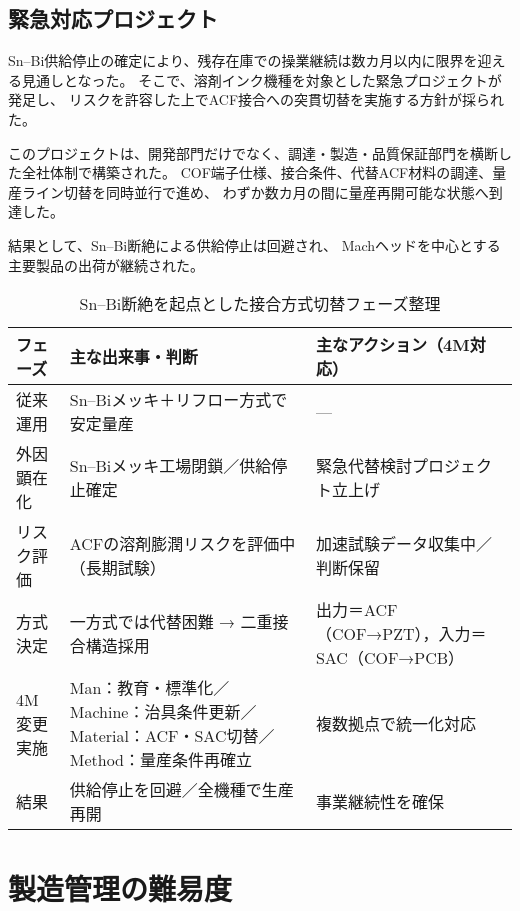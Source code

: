 \documentclass[conference]{IEEEtran}
\begin{document}
\subsection{緊急対応プロジェクト}
Sn–Bi供給停止の確定により、残存在庫での操業継続は数カ月以内に限界を迎える見通しとなった。  
そこで、溶剤インク機種を対象とした緊急プロジェクトが発足し、  
リスクを許容した上でACF接合への突貫切替を実施する方針が採られた。  

このプロジェクトは、開発部門だけでなく、調達・製造・品質保証部門を横断した全社体制で構築された。  
COF端子仕様、接合条件、代替ACF材料の調達、量産ライン切替を同時並行で進め、  
わずか数カ月の間に量産再開可能な状態へ到達した。  

結果として、Sn–Bi断絶による供給停止は回避され、  
Machヘッドを中心とする主要製品の出荷が継続された。

\begin{table}[t]
\centering
\footnotesize
\caption{Sn–Bi断絶を起点とした接合方式切替フェーズ整理}
\label{tab:flow}
\renewcommand{\arraystretch}{1.1}
\begin{tabularx}{\columnwidth}{@{}p{1.9cm} Y Y@{}}
\toprule
フェーズ & 主な出来事・判断 & 主なアクション（4M対応） \\
\midrule
従来運用 &
Sn–Biメッキ＋リフロー方式で安定量産 &
— \\
\addlinespace[2pt]
外因顕在化 &
Sn–Biメッキ工場閉鎖／供給停止確定 &
緊急代替検討プロジェクト立上げ \\
\addlinespace[2pt]
リスク評価 &
ACFの溶剤膨潤リスクを評価中（長期試験） &
加速試験データ収集中／判断保留 \\
\addlinespace[2pt]
方式決定 &
一方式では代替困難 → 二重接合構造採用 &
出力＝ACF（COF→PZT），入力＝SAC（COF→PCB） \\
\addlinespace[2pt]
4M変更実施 &
Man：教育・標準化／Machine：治具条件更新／Material：ACF・SAC切替／Method：量産条件再確立 &
複数拠点で統一化対応 \\
\addlinespace[2pt]
結果 &
供給停止を回避／全機種で生産再開 &
事業継続性を確保 \\
\bottomrule
\end{tabularx}
\end{table}

\section{製造管理の難易度}
\end{document}

